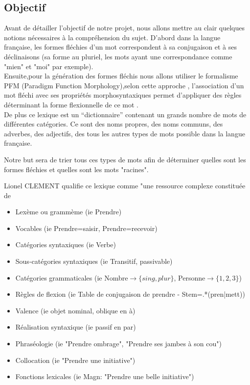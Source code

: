 \documentclass[12pt,a4paper]{article}
\begin{document}
\subsection{Objectif}

Avant de détailler l'objectif de notre projet, nous allons mettre
au clair quelques notions nécessaires à la compréhension du sujet. 
D'abord dans la langue française, les formes fléchies d'un mot correspondent à sa conjugaison et à ses déclinaisons (sa forme au pluriel, les mots ayant une correspondance comme "mien" et "moi" par exemple).\\
Ensuite,pour la génération des formes fléchis nous allons utiliser le formalisme PFM (Paradigm Function Morphology),selon cette approche , l'association d'un mot  fléchi avec ses propriétés morphosyntaxiques permet d'appliquer des règles déterminant la forme flexionnelle de ce mot .\\
De plus ce lexique est un “dictionnaire” contenant un grands nombre de mots de différentes catégories. Ce sont des noms propres, des noms communs, des adverbes, des adjectifs, des tous les autres types de mots possible dans la langue française. 

Notre but sera de trier tous ces types de mots afin de déterminer quelles sont les formes fléchies et quelles sont les mots "racines".

Lionel CLEMENT qualifie ce lexique comme "une ressource complexe constituée de
\begin{itemize}
\item Lexème ou grammème (ie Prendre)
\item Vocables (ie Prendre=saisir, Prendre=recevoir)
\item Catégories syntaxiques (ie Verbe)
\item Sous-catégories syntaxiques (ie Transitif, passivable)
\item Catégories grammaticales (ie Nombre$\rightarrow\{sing, plur\}$, Personne$\rightarrow\{1, 2, 3\}$)
\item Règles de flexion (ie Table de conjugaison de prendre - Stem=.*(pren|mett))
\item Valence (ie objet nominal, oblique en à)
\item Réalisation syntaxique (ie passif en par)
\item Phraséologie (ie "Prendre ombrage", "Prendre ses jambes à son cou")
\item Collocation (ie "Prendre une initiative")
\item Fonctions lexicales (ie Magn: "Prendre une belle initiative")
\end{itemize}
\end{document}
